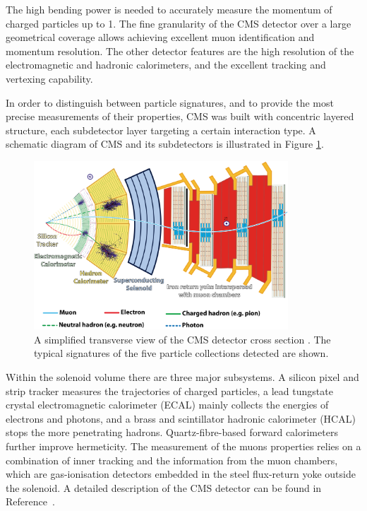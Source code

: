 The high bending power is needed to accurately measure the momentum of charged particles up to 1\TeV.
The fine granularity of the CMS detector over a large geometrical coverage allows achieving excellent muon identification and momentum resolution.
The other detector features are the high resolution of the electromagnetic and hadronic calorimeters, and the excellent tracking and vertexing capability.

In order to distinguish between particle signatures, and to provide the most precise measurements of their properties,
CMS was built with concentric layered structure, each subdetector layer targeting a certain interaction type.
A schematic diagram of CMS and its subdetectors is illustrated in Figure \ref{fig:CMSslice}.

\begin{figure}[htb]
\begin{center}
\includegraphics[width=0.85\textwidth]{Figures/CMSslice_whiteBackground.png}
\end{center}
\caption{A simplified transverse view of the CMS detector cross section \cite{CMS-PHO-GEN-2016-001}. The typical signatures of the five particle collections detected are shown.}
\label{fig:CMSslice}
\end{figure}

Within the solenoid volume there are three major subsystems.
A silicon pixel and strip tracker measures the trajectories of charged particles,
a lead tungstate crystal electromagnetic calorimeter (ECAL) mainly collects the energies of electrons and photons,
and a brass and scintillator hadronic calorimeter (HCAL) stops the more penetrating hadrons.
Quartz-fibre-based forward calorimeters further improve hermeticity.
The measurement of the muons properties relies on a combination of inner tracking and the information from the muon chambers,
which are gas-ionisation detectors embedded in the steel flux-return yoke outside the solenoid.
A detailed description of the CMS detector can be found in Reference~\cite{CMS-CMS-00-001}.

